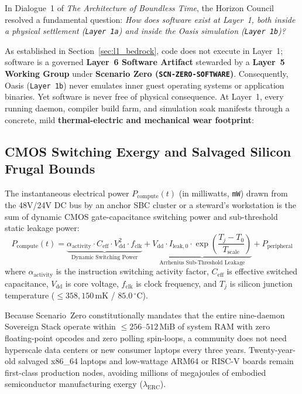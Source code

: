 In Dialogue~1 of \textit{The Architecture of Boundless Time}, the Horizon Council resolved a fundamental question: \textit{How does software exist at Layer~1, both inside a physical settlement (\texttt{Layer 1a}) and inside the Oasis simulation (\texttt{Layer 1b})?}

As established in Section~\ref{sec:l1_bedrock}, code does not execute in Layer~1; software is a governed \textbf{Layer~6 Software Artifact} stewarded by a \textbf{Layer~5 Working Group} under \textbf{Scenario Zero (\texttt{SCN-ZERO-SOFTWARE})}. Consequently, Oasis (\texttt{Layer 1b}) never emulates inner guest operating systems or application binaries. Yet software is never free of physical consequence. At Layer~1, every running daemon, compiler build farm, and simulation soak manifests through a concrete, mild \textbf{thermal-electric and mechanical wear footprint}:

\subsection{CMOS Switching Exergy and Salvaged Silicon Frugal Bounds}

The instantaneous electrical power $P_{\mathrm{compute}}(t)$ (in milliwatts, \texttt{mW}) drawn from the 48V/24V DC bus by an anchor SBC cluster or a steward's workstation is the sum of dynamic CMOS gate-capacitance switching power and sub-threshold static leakage power:
\begin{equation}
P_{\mathrm{compute}}(t) = \underbrace{\alpha_{\mathrm{activity}} \cdot C_{\mathrm{eff}} \cdot V_{\mathrm{dd}}^2 \cdot f_{\mathrm{clk}}}_{\text{Dynamic Switching Power}} + \underbrace{V_{\mathrm{dd}} \cdot I_{\mathrm{leak},0} \cdot \exp\left(\frac{T_j - T_0}{T_{\mathrm{scale}}}\right)}_{\text{Arrhenius Sub-Threshold Leakage}} + P_{\mathrm{peripheral}}
\label{eq:l1_cmos_power}
\end{equation}
where $\alpha_{\mathrm{activity}}$ is the instruction switching activity factor, $C_{\mathrm{eff}}$ is effective switched capacitance, $V_{\mathrm{dd}}$ is core voltage, $f_{\mathrm{clk}}$ is clock frequency, and $T_j$ is silicon junction temperature ($\le 358{,}150\,\mathrm{mK}$ / $85.0\,^\circ\mathrm{C}$).

Because Scenario~Zero constitutionally mandates that the entire nine-daemon Sovereign Stack operate within $\le 256\text{--}512\,\mathrm{MiB}$ of system RAM with zero floating-point opcodes and zero polling spin-loops, a community does not need hyperscale data centers or new consumer laptops every three years. Twenty-year-old salvaged x86\_64 laptops and low-wattage ARM64 or RISC-V boards remain first-class production nodes, avoiding millions of megajoules of embodied semiconductor manufacturing exergy ($\lambda_{\mathrm{ERC}}$).

